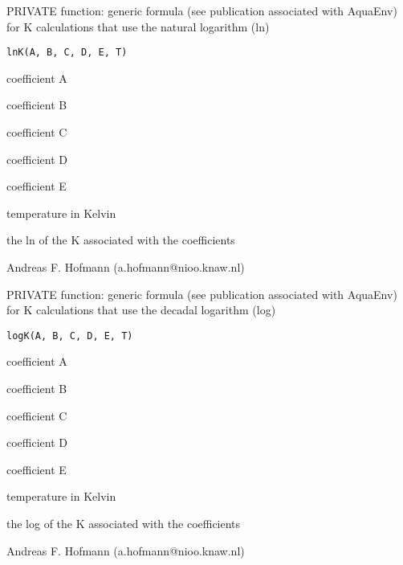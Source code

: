 \documentclass{article}
\begin{document}
\begin{Description}\relax
PRIVATE function: generic formula (see publication associated with AquaEnv) for K calculations that use the natural logarithm (ln)
\end{Description}
\begin{Usage}
\begin{verbatim}lnK(A, B, C, D, E, T)\end{verbatim}
\end{Usage}
\begin{Arguments}
\begin{ldescription}
\item[\code{A }] coefficient A
\item[\code{B }] coefficient B
\item[\code{C }] coefficient C
\item[\code{D }] coefficient D
\item[\code{E }] coefficient E
\item[\code{T }] temperature in Kelvin
\end{ldescription}
\end{Arguments}
\begin{Value}
the ln of the K associated with the coefficients
\end{Value}
\begin{Author}\relax
Andreas F. Hofmann (a.hofmann@nioo.knaw.nl)
\end{Author}

\begin{Description}\relax
PRIVATE function: generic formula (see publication associated with AquaEnv) for K calculations that use the decadal logarithm (log)
\end{Description}
\begin{Usage}
\begin{verbatim}logK(A, B, C, D, E, T)\end{verbatim}
\end{Usage}
\begin{Arguments}
\begin{ldescription}
\item[\code{A }] coefficient A
\item[\code{B }] coefficient B
\item[\code{C }] coefficient C
\item[\code{D }] coefficient D
\item[\code{E }] coefficient E
\item[\code{T }] temperature in Kelvin
\end{ldescription}
\end{Arguments}
\begin{Value}
the log of the K associated with the coefficients
\end{Value}
\begin{Author}\relax
Andreas F. Hofmann (a.hofmann@nioo.knaw.nl)
\end{Author}
\end{document}
